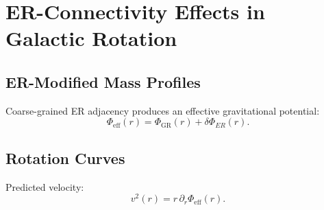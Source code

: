 \chapter{ER-Connectivity Effects in Galactic Rotation}

\section{ER-Modified Mass Profiles}
Coarse-grained ER adjacency produces an effective gravitational potential:
\[
\Phi_{\mathrm{eff}}(r)=\Phi_{\mathrm{GR}}(r)+\delta\Phi_{ER}(r).
\]

\section{Rotation Curves}
Predicted velocity:
\[
v^2(r)=r\,\partial_r\Phi_{\mathrm{eff}}(r).
\]

